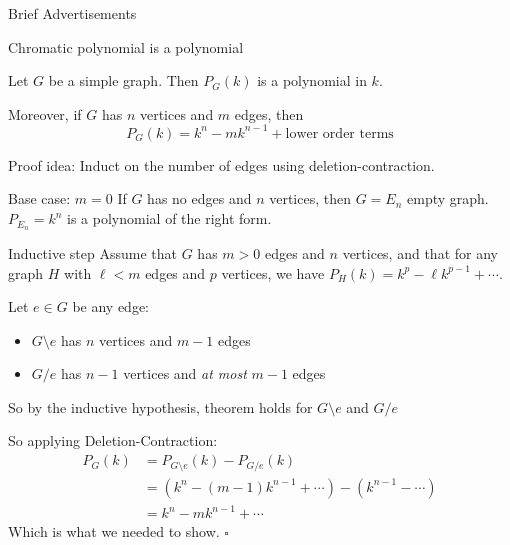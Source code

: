 \documentclass{beamer}
\begin{document}
\begin{frame}{Brief Advertisements}
\end{frame}


\begin{frame}{Chromatic polynomial is a polynomial}
\begin{theorem}
Let $G$ be a simple graph. Then $P_G(k)$ is a polynomial in $k$.  

Moreover, if $G$ has $n$ vertices and $m$ edges, then 
$$P_G(k)=k^n-mk^{n-1}+\text{lower order terms}$$
\end{theorem}

\begin{block}{Proof idea:}
Induct on the number of edges using deletion-contraction.
\end{block}
\begin{block}{Base case: $m=0$}
If $G$ has no edges and $n$ vertices, then $G=E_n$ empty graph.
$P_{E_n}=k^n$ is a polynomial of the right form.
\end{block}

\end{frame}
\begin{frame}{Inductive step}
Assume that $G$ has $m>0$ edges and $n$ vertices, and that for any graph $H$ with $\ell<m$ edges and $p$ vertices, we have $P_H(k)=k^p-\ell k^{p-1}+\cdots$.

\begin{block}{Let $e\in G$ be any edge:}
\begin{itemize}
    \item $G\setminus e$ has $n$ vertices and $m-1$ edges
    \item $G/e$ has $n-1$ vertices and \emph{at most} $m-1$ edges
\end{itemize}
So by the inductive hypothesis, theorem holds for $G\setminus e$ and $G/e$
\end{block}
\begin{block}{So applying Deletion-Contraction:}\begin{align*}
    P_G(k) &= P_{G\setminus e}(k)-P_{G/e}(k) \\
    &= \left(k^n-(m-1)k^{n-1} +\cdots\right) -\left(k^{n-1}-\cdots\right) \\
    &= k^n-mk^{n-1}+\cdots
\end{align*}
Which is what we needed to show. \quad$\square$
\end{block}

\end{frame}
\end{document}
